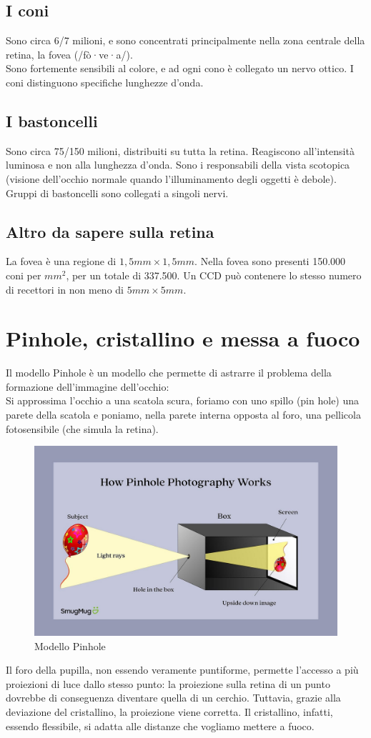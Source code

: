 \documentclass{report}
\begin{document}
	\subsection{I coni}
	Sono circa 6/7 milioni, e sono concentrati principalmente nella zona centrale della retina, la fovea (/fò·ve·a/).\\
	Sono fortemente sensibili al colore, e ad ogni cono è collegato un nervo ottico. I coni distinguono specifiche lunghezze d'onda.
	\subsection{I bastoncelli}
	Sono circa 75/150 milioni, distribuiti su tutta la retina.
	Reagiscono all'intensità luminosa e non alla lunghezza d'onda. Sono i responsabili della vista scotopica (visione dell'occhio normale quando l'illuminamento degli oggetti è debole). Gruppi di bastoncelli sono collegati a singoli nervi.
	\subsection{Altro da sapere sulla retina}
	La fovea è una regione di $1,5 mm \times 1,5 mm$.
	Nella fovea sono presenti 150.000 coni per $mm^2$, per un totale di 337.500.
	Un CCD può contenere lo stesso numero di recettori in non meno di $5mm \times 5mm$.
	\section{Pinhole, cristallino e messa a fuoco}
	Il modello Pinhole è un modello che permette di astrarre il problema della formazione dell'immagine dell'occhio:\\
	Si approssima l'occhio a una scatola scura, foriamo con uno spillo (pin hole) una parete della scatola e poniamo, nella parete interna opposta al foro, una pellicola fotosensibile (che simula la retina).
	\begin{figure}[htp]
		\centering
		\includegraphics[width=0.57\linewidth]{pinhole.jpeg}
		\caption{Modello Pinhole}
	\end{figure}
	Il foro della pupilla, non essendo veramente puntiforme, permette l'accesso a più proiezioni di luce dallo stesso punto: la proiezione sulla retina di un punto dovrebbe di conseguenza diventare quella di un cerchio. Tuttavia, grazie alla deviazione del cristallino, la proiezione viene corretta. Il cristallino, infatti, essendo flessibile, si adatta alle distanze che vogliamo mettere a fuoco. 
		
\end{document}

